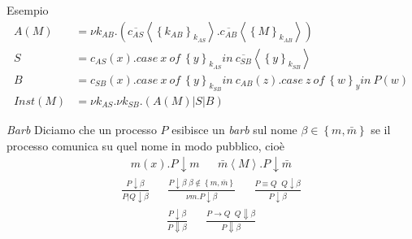 \documentclass{beamer}
\theoremstyle{plain}
\theoremstyle{definition}
\theoremstyle{remark}
\newcommand{\obar}[1]{\overline{#1}}
\newcommand{\set}[1]{\left\{#1\right\}}
\newcommand{\pa}[1]{\left(#1\right)}
\newcommand{\ang}[1]{\left<#1\right>}
\begin{document}
\begin{frame}{Esempio}
  \begin{align*}
    A(M) & = \nu k_{AB}. \pa{
           \obar{c_{AS}}\ang{\set{k_{AB}}_{k_{AS}}}. \obar{c_{AB}}\ang{\set{M}_{k_{AB}}}}
    \\
    S & = c_{AS}(x).case\ x\ of\ \set{y}_{k_{AS}}in\ 
        \obar{c_{SB}}\ang{\set{y}_{k_{SB}}} \\ 
    B & = c_{SB}(x).case\ x\ of\ \set{y}_{k_{SB}}in\ c_{AB}(z). case\
        z\ of\ \set{w}_y in\ P(w) \\ 
    Inst(M) & = \nu k_{AS}. \nu k_{SB}. \pa{ A(M) | S | B } 
  \end{align*}

\end{frame}


\begin{frame}{\textit{Barb}}
  Diciamo che un processo $P$ esibisce un \textit{barb} sul nome
  $\beta \in \set{m,\bar m}$ se il processo comunica su quel nome in
  modo pubblico, cioè
  \begin{align*}
    m(x).P \downarrow m & & \bar m \ang{M}.P \downarrow \bar m 
  \end{align*}
  \begin{align*}
    \frac{P\downarrow \beta}{ P|Q \downarrow \beta} & &
                                                        \frac{P\downarrow
                                                        \beta\; \beta
                                                      \not\in \set{m,
                                                      \bar m}}{ \nu
                                                      m. P \downarrow
                                                      \beta} & & \frac{
                                                               P
                                                               \equiv
                                                               Q \;\; Q
                                                               \downarrow
                                                               \beta}
                                                               {
                                                               P\downarrow
                                                               \beta}
  \end{align*}
  \begin{align*}
    \frac{P\downarrow \beta}{P\Downarrow \beta} & & \frac{P\rightarrow
                                                    Q\;\; Q \Downarrow
                                                    \beta }{P
                                                    \Downarrow \beta}
  \end{align*}
\end{frame}
\end{document}

